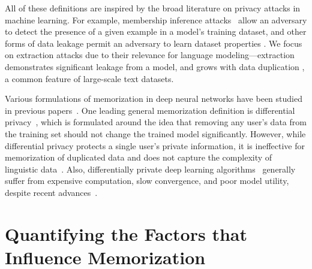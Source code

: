 

All of these definitions are inspired by the broad literature on privacy attacks in machine learning.
For example, membership inference attacks~\citep{shokri2017membership, yeom2018privacy} allow an adversary to detect the presence of a given example in a model's training dataset, and other forms of data leakage permit an adversary to learn dataset properties \citep{ganju2018property,fredrikson2015model}.
We focus on extraction attacks due to their relevance for language modeling---extraction demonstrates significant leakage from a model, and grows with data duplication \citep{lee2021deduplicating}, a common feature of large-scale text datasets.


Various formulations of memorization in deep neural networks have been studied in previous papers~\citep{carlini2019secret,carlini2020extracting,feldman2020neural,zhang2021counterfactual,colinpaper}. 
One leading general memorization definition is differential privacy~\citep{dwork2006calibrating}, which is formulated around the idea that removing any user's data from the training set should not change the trained model significantly.
However, while differential privacy protects a single user's private information, it is ineffective for memorization of duplicated data and does not capture the complexity of linguistic data~\citep{brown2022does}.
Also, differentially private deep learning algorithms~\citep{abadi2016deep} generally suffer from expensive computation, slow convergence, and poor model utility, despite recent advances~\citep{anil2021large}.


\section{Quantifying the Factors that Influence Memorization}
\label{section:quantifying_memorization}


